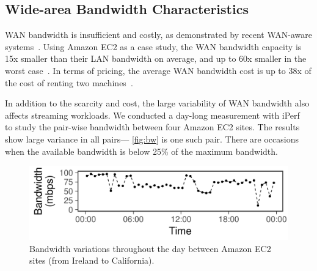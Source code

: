 

\subsection{Wide-area Bandwidth Characteristics}
\label{sec:wide-area-bandwidth}

WAN bandwidth is insufficient and costly, as demonstrated by recent WAN-aware
systems~\cite{hsieh17gaia, pu2015low, vulimiri2015wananlytics,
  vulimiri2015global}. Using Amazon EC2 as a case study, the WAN bandwidth
capacity is 15x smaller than their LAN bandwidth on average, and up to 60x
smaller in the worst case~\cite{hsieh17gaia}. In terms of pricing, the average
WAN bandwidth cost is up to 38x of the cost of renting two
machines~\cite{amazon2017pricing, hsieh17gaia}.

In addition to the scarcity and cost, the large variability of WAN bandwidth
also affects streaming workloads. We conducted a day-long measurement with
iPerf~\cite{iperf3} to study the pair-wise bandwidth between four Amazon EC2
sites.  The results show large variance in all pairs---
\autoref{fig:bw} is one
such pair.  There are occasions when
the available bandwidth is below 25\% of the
maximum bandwidth.

\begin{figure}
  \centering
  \includegraphics[width=0.9\linewidth]{figures/aws-variation.pdf}
  \caption{Bandwidth variations throughout the day between Amazon EC2 sites
    (from Ireland to California).}
  \label{fig:bw}
\end{figure}

